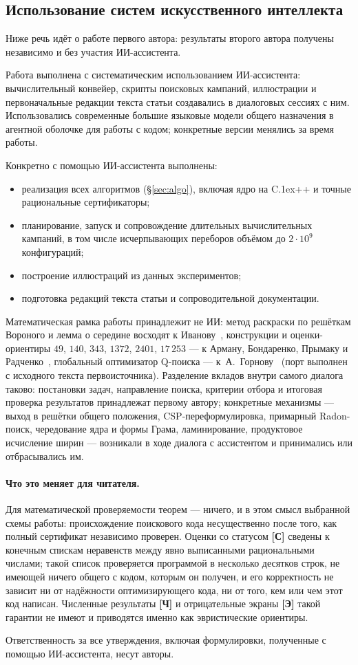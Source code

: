 \subsection{Использование систем искусственного интеллекта}

Ниже речь идёт о работе первого автора: результаты второго автора получены
независимо и без участия ИИ-ассистента.

Работа выполнена с систематическим использованием ИИ-ассистента: вычислительный
конвейер, скрипты поисковых кампаний, иллюстрации и первоначальные редакции
текста статьи создавались в диалоговых сессиях с ним. Использовались
современные большие языковые модели общего назначения в агентной оболочке для
работы с кодом; конкретные версии менялись за время работы.

Конкретно с помощью ИИ-ассистента выполнены:
\begin{itemize}[leftmargin=1.4em,itemsep=1pt]
\item реализация всех алгоритмов (\S\ref{sec:algo}), включая ядро на
C\raise.1ex\hbox{\small++} и точные рациональные сертификаторы;
\item планирование, запуск и сопровождение длительных вычислительных кампаний,
в том числе исчерпывающих переборов объёмом до $2\cdot10^9$ конфигураций;
\item построение иллюстраций из данных экспериментов;
\item подготовка редакций текста статьи и сопроводительной документации.
\end{itemize}

Математическая рамка работы принадлежит не ИИ: метод раскраски по решёткам
Вороного и лемма о середине восходят к Иванову~\cite{Ivanov2011}, конструкции и
оценки-ориентиры $49$, $140$, $343$, $1372$, $2401$, $17\,253$ --- к Арману,
Бондаренко, Прымаку и Радченко~\cite{ABPR}, глобальный оптимизатор Q-поиска ---
к~А.~Горнову~\cite{GornovQ} (порт выполнен с исходного текста
первоисточника). Разделение вкладов внутри самого диалога таково: постановки
задач, направление поиска, критерии отбора и итоговая проверка результатов
принадлежат первому автору; конкретные механизмы --- выход в решётки общего
положения, CSP-переформулировка, примарный Radon-поиск, чередование ядра и
формы Грама, ламинирование, продуктовое исчисление ширин --- возникали в ходе
диалога с ассистентом и принимались или отбрасывались им.

\paragraph{Что это меняет для читателя.} Для математической проверяемости
теорем --- ничего, и в этом смысл выбранной схемы работы: происхождение
поискового кода несущественно после того, как полный сертификат независимо
проверен. Оценки со статусом \textbf{[С]} сведены к конечным спискам
неравенств между явно выписанными рациональными числами; такой список
проверяется программой в несколько десятков строк, не имеющей ничего общего с
кодом, которым он получен, и его корректность не зависит ни от надёжности
оптимизирующего кода, ни от того, кем или чем этот код написан. Численные
результаты \textbf{[Ч]} и отрицательные экраны \textbf{[Э]} такой гарантии не
имеют и приводятся именно как эвристические ориентиры.

Ответственность за все утверждения, включая формулировки, полученные с помощью
ИИ-ассистента, несут авторы.
